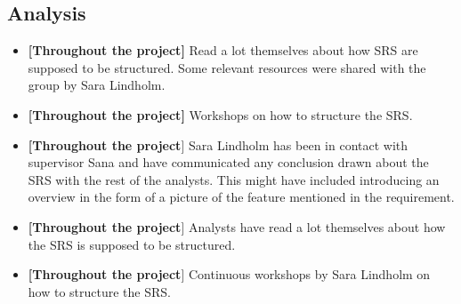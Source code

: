 \subsection{Analysis}
\begin{itemize}
    \item \textbf{[Throughout the project]} Read a lot themselves about how SRS are supposed to be structured. Some relevant resources were shared with the group by Sara Lindholm. 
    \item \textbf{[Throughout the project]} Workshops on how to structure the SRS. 
       \item \textbf{[Throughout the project}] Sara Lindholm has been in contact with supervisor Sana and have communicated any conclusion drawn about the SRS with the rest of the analysts. This might have included introducing an overview in the form of a picture of the feature mentioned in the requirement. 
    \item \textbf{[Throughout the project}] Analysts have read a lot themselves about how the SRS is supposed to be structured.
    \item \textbf{[Throughout the project}] Continuous workshops by Sara Lindholm on how to structure the SRS. 

\end{itemize}

